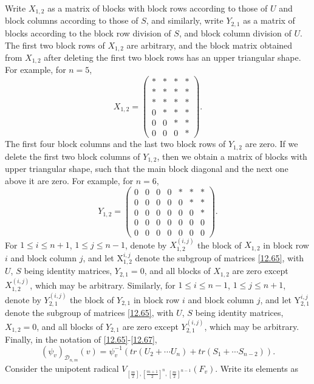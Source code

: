 \documentclass[12pts]{amsart}
\begin{document}
Write $X_{1,2}$ as a matrix of blocks with block rows according to those of $U$ and block columns according to those of $S$, and similarly, write $Y_{2,1}$ as a matrix of blocks according to the block row division of $S$, and block column division of $U$. The first two block rows of $X_{1,2}$ are arbitrary, and the block matrix obtained from $X_{1,2}$ after deleting the first two block rows has an upper triangular shape. For example, for $n=5$,
$$
X_{1,2}=\begin{pmatrix}\ast&\ast&\ast&\ast\\\ast&\ast&\ast&\ast\\\ast&\ast&\ast&\ast\\0&\ast&\ast&\ast\\0&0&\ast&\ast\\0&0&0&\ast\end{pmatrix}.
$$
The first four block columns and the last two block rows of $Y_{1,2}$ are zero. If we delete the first two block columns of $Y_{1,2}$, then we obtain a matrix of blocks with upper triangular shape, such that the main block diagonal and the next one above it are zero. For example, for $n=6$,
$$
Y_{1,2}=\begin{pmatrix}0&0&0&0&\ast&\ast&\ast\\0&0&0&0&0&\ast&\ast\\0&0&0&0&0&0&\ast\\
0&0&0&0&0&0&0\\0&0&0&0&0&0&0\end{pmatrix}.
$$
For $1\leq i\leq n+1$, $1\leq j\leq n-1$, denote by $X_{1,2}^{(i,j)}$ the block of $X_{1,2}$ in block row $i$ and block column $j$, and let $\mathrm{X}_{1,2}^{i,j}$ denote the subgroup of matrices \eqref{12.65}, with $U$, $S$ being identity matrices, $Y_{2,1}=0$, and all blocks of $X_{1,2}$ are zero except $X_{1,2}^{(i,j)}$, which may be arbitrary. Similarly, for $1\leq i\leq n-1$, $1\leq j\leq n+1$, denote by $Y_{2,1}^{(i,j)}$ the block of $Y_{2,1}$ in block row $i$ and block column $j$, and let $\mathrm{Y}_{2,1}^{i,j}$ denote the subgroup of matrices \eqref{12.65}, with $U$, $S$ being identity matrices, $X_{1,2}=0$, and all blocks of $Y_{2,1}$ are zero except $Y_{2,1}^{(i,j)}$, which may be arbitrary. Finally, in the notation of \eqref{12.65}-\eqref{12.67},
\begin{equation}\label{12.68}
(\psi_v)_{\mathcal{D}_{n,m}}(v)=\psi_v^{-1}(tr(U_2+\cdots U_n)+tr(S_1+\cdots S_{n-2})).
\end{equation}
Consider the unipotent radical $V_{[\frac{m}{2}],[\frac{m+1}{2}]^n,[\frac{m}{2}]^{n-1}}(F_v)$. Write its elements as
\end{document}
